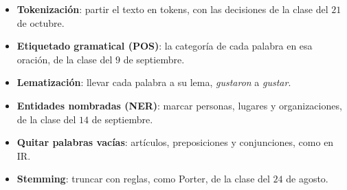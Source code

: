 \documentclass[11pt,letterpaper]{article}
\begin{document}
\begin{itemize}[itemsep=0.3em]
    \item \textbf{Tokenización}: partir el texto en tokens, con las
          decisiones de la clase del $21$ de octubre.
    \item \textbf{Etiquetado gramatical (POS)}: la categoría de cada
          palabra en esa oración, de la clase del $9$ de septiembre.
    \item \textbf{Lematización}: llevar cada palabra a su lema,
          \textit{gustaron} a \textit{gustar}.
    \item \textbf{Entidades nombradas (NER)}: marcar personas,
          lugares y organizaciones, de la clase del $14$ de
          septiembre.
    \item \textbf{Quitar palabras vacías}: artículos, preposiciones y
          conjunciones, como en IR.
    \item \textbf{Stemming}: truncar con reglas, como Porter, de la
          clase del $24$ de agosto.
\end{itemize}
\end{document}
